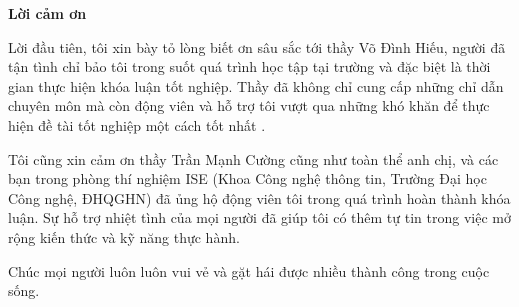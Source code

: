 \begin{center}
\textbf{\large{Lời cảm ơn}	}
\end{center}

Lời đầu tiên, tôi xin bày tỏ lòng biết ơn sâu sắc tới thầy Võ Đình Hiếu, người đã tận tình chỉ bảo tôi trong suốt quá trình học tập tại trường và đặc biệt là thời gian thực hiện khóa luận tốt nghiệp.
Thầy đã không chỉ cung cấp những chỉ dẫn chuyên môn mà còn động viên và hỗ trợ tôi vượt qua những khó khăn để thực hiện đề tài tốt nghiệp một cách tốt nhất .

Tôi cũng xin cảm ơn thầy Trần Mạnh Cường cũng như toàn thể anh chị, và các bạn trong phòng thí nghiệm ISE (Khoa Công nghệ thông tin, Trường Đại học Công nghệ, ĐHQGHN) đã ủng hộ động viên tôi trong quá trình hoàn thành khóa luận.
Sự hỗ trợ nhiệt tình của mọi người đã giúp tôi có thêm tự tin trong việc mở rộng kiến thức và kỹ năng thực hành.

Chúc mọi người luôn luôn vui vẻ và gặt hái được nhiều thành công trong cuộc sống.

